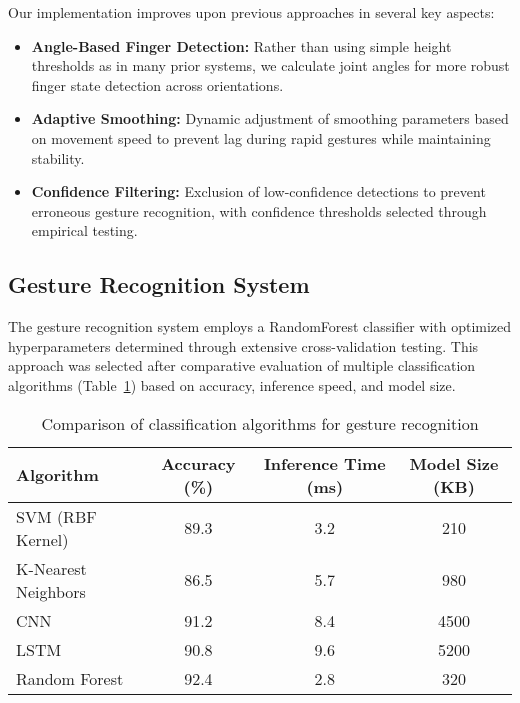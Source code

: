 \documentclass[arxiv,usenatbib]{iupartex}
\begin{document}
Our implementation improves upon previous approaches in several key aspects:

\begin{itemize}
  \item \textbf{Angle-Based Finger Detection:} Rather than using simple height thresholds as in many prior systems, we calculate joint angles for more robust finger state detection across orientations.
  
  \item \textbf{Adaptive Smoothing:} Dynamic adjustment of smoothing parameters based on movement speed to prevent lag during rapid gestures while maintaining stability.
  
  \item \textbf{Confidence Filtering:} Exclusion of low-confidence detections to prevent erroneous gesture recognition, with confidence thresholds selected through empirical testing.
\end{itemize}

\subsection{Gesture Recognition System}
The gesture recognition system employs a RandomForest classifier with optimized hyperparameters determined through extensive cross-validation testing. This approach was selected after comparative evaluation of multiple classification algorithms (Table~\ref{table1}) based on accuracy, inference speed, and model size.

\setlength{\tabcolsep}{5mm}
\renewcommand{\arraystretch}{1.0}
\begin{table}
    \label{table1}
    \caption{Comparison of classification algorithms for gesture recognition}
    \centering
    \begin{tabular}{lccc}
        \hline
        Algorithm & Accuracy (\%) & Inference Time (ms) & Model Size (KB) \\
        \hline
        SVM (RBF Kernel) & 89.3 & 3.2 & 210 \\
        K-Nearest Neighbors & 86.5 & 5.7 & 980 \\
        CNN & 91.2 & 8.4 & 4500 \\
        LSTM & 90.8 & 9.6 & 5200 \\
        Random Forest & 92.4 & 2.8 & 320 \\
        \hline
    \end{tabular}
\end{table}%
\end{document}
